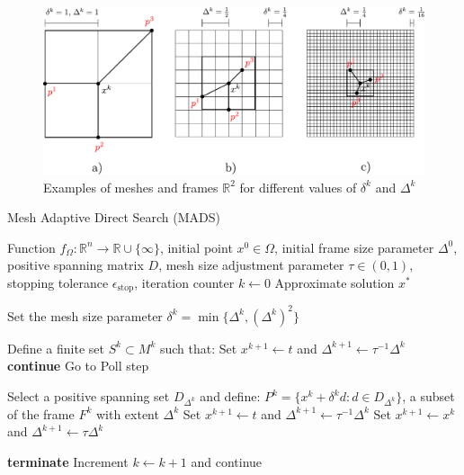 \begin{figure}[H]
	\centering
	\includegraphics[width=1.01\textwidth]{figures/mads.pdf}
	\caption{Examples of meshes and frames $\mathbb{R}^2$ for different
		values of $\delta^k$ and $\Delta^k$}
	\label{fig:mads}
\end{figure}



\begin{algorithm}[H]
	\caption{Mesh Adaptive Direct Search (MADS)}\label{MADS}
	\begin{algorithmic}[1]
		\Require Function $f_{\Omega}: \mathbb{R}^n \to \mathbb{R} \cup \{\infty\}$, initial point $x^0 \in \Omega$, initial frame size parameter $\Delta^0$, positive spanning matrix $D$, mesh size adjustment parameter $\tau \in (0,1)$, stopping tolerance $\epsilon_{\text{stop}}$, iteration counter $k \gets 0$
		\Ensure Approximate solution $x^*$
		
		
		
		\State Set the mesh size parameter $\delta^k = \min \{\Delta^k, (\Delta^k)^2\}$
		
		\State Define a finite set $S^k \subset M^k$ such that:
		\State Set $x^{k+1} \gets t$ and $\Delta^{k+1} \gets \tau^{-1}\Delta^k$
		\State \textbf{continue}
		\Else
		\State Go to Poll step
		\EndIf
		
		\State Select a positive spanning set $D_{\Delta^k}$ and define:
		\State $P^k = \{x^k + \delta^k d : d \in D_{\Delta^k}\}$, a subset of the frame $F^k$ with extent $\Delta^k$
		\State Set $x^{k+1} \gets t$ and $\Delta^{k+1} \gets \tau^{-1}\Delta^k$
		\Else
		\State Set $x^{k+1} \gets x^k$ and $\Delta^{k+1} \gets \tau\Delta^k$
		\EndIf
		
		\State \textbf{terminate}
		\Else
		\State Increment $k \gets k+1$ and continue
		\EndIf
		
		\EndWhile
		\EndProcedure
	\end{algorithmic}
\end{algorithm}